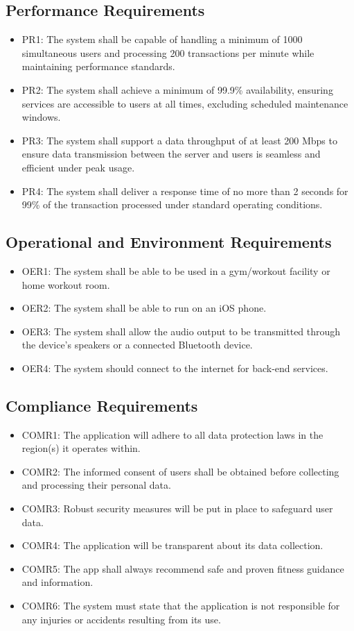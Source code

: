 \documentclass[12pt]{article}
\begin{document}
\subsection{Performance Requirements}
\begin{itemize}
\item PR1: The system shall be capable of handling a minimum of 1000 simultaneous users and processing 200 transactions per minute while maintaining performance standards.
\item PR2: The system shall achieve a minimum of 99.9\% availability, ensuring services are accessible to users at all times, excluding scheduled maintenance windows.
\item PR3: The system shall support a data throughput of at least 200 Mbps to ensure data transmission between the server and users is seamless and efficient under peak usage.
\item PR4: The system shall deliver a response time of no more than 2 seconds for 99\% of the transaction processed under standard operating conditions.
\end{itemize}

\subsection{Operational and Environment Requirements}
\begin{itemize}
\item OER1: The system shall be able to be used in a gym/workout facility or home workout room.
\item OER2: The system shall be able to run on an iOS phone.
\item OER3: The system shall allow the audio output to be transmitted through the device’s speakers or a connected Bluetooth device.
\item OER4: The system should connect to the internet for back-end services.
\end{itemize}

\subsection{Compliance Requirements}
\begin{itemize}
\item COMR1: The application will adhere to all data protection laws in the region(s) it operates within.
\item COMR2: The informed consent of users shall be obtained before collecting and processing their personal data.
\item COMR3: Robust security measures will be put in place to safeguard user data.
\item COMR4: The application will be transparent about its data collection.
\item COMR5: The app shall always recommend safe and proven fitness guidance and information.
\item COMR6: The system must state that the application is not responsible for any injuries or accidents resulting from its use.
\end{itemize}
\end{document}
